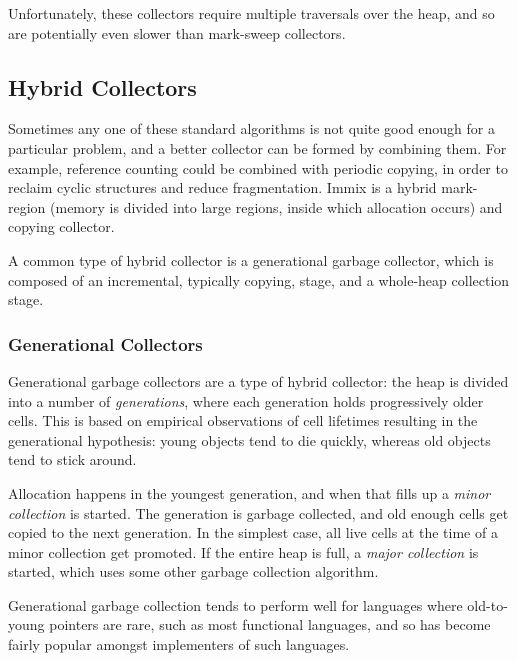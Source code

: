 Unfortunately, these collectors require multiple traversals over the
heap, and so are potentially even slower than mark-sweep
collectors\cite{GarbageCollection}.

\subsection{Hybrid Collectors}
\label{sec:lit-gc-hybrid}

Sometimes any one of these standard algorithms is not quite good
enough for a particular problem, and a better collector can be formed
by combining them. For example, reference counting could be combined
with periodic copying, in order to reclaim cyclic structures and
reduce fragmentation. Immix\cite{Blackburn08} is a hybrid mark-region
(memory is divided into large regions, inside which allocation occurs)
and copying collector.

A common type of hybrid collector is a generational garbage collector,
which is composed of an incremental, typically copying, stage, and a
whole-heap collection stage.

\subsubsection{Generational Collectors}
\label{sec:lit-gc-hybrid-generational}

Generational garbage collectors are a type of hybrid collector: the
heap is divided into a number of \textit{generations}, where each
generation holds progressively older cells. This is based on empirical
observations of cell lifetimes resulting in the generational
hypothesis: young objects tend to die quickly, whereas old objects
tend to stick around\cite{Ungar84}.

Allocation happens in the youngest generation, and when that fills up
a \textit{minor collection} is started. The generation is garbage
collected, and old enough cells get copied to the next
generation\cite{Ungar84}. In the simplest case, all live cells at the
time of a minor collection get promoted. If the entire heap is full, a
\textit{major collection} is started, which uses some other garbage
collection algorithm\cite{GarbageCollection}.

Generational garbage collection tends to perform well for languages
where old-to-young pointers are rare\cite{Appel89}, such as most
functional languages, and so has become fairly popular amongst
implementers of such
languages\cite{Rojemo95}\cite{Sansom93}\cite{Seward92}.

